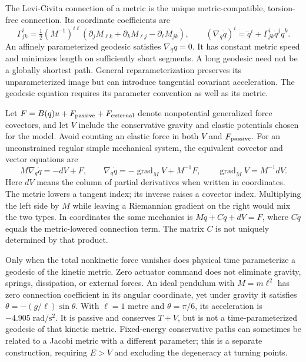 \documentclass[12pt, openany]{book}
\theoremstyle{plain}
\begin{document}
The Levi-Civita connection of a metric is the unique metric-compatible,
torsion-free connection. Its coordinate coefficients are
\begin{equation}\label{eq:manifold_christoffel}
 \Gamma^i_{jk}=\tfrac12(M^{-1})^{i\ell}
 (\partial_jM_{\ell k}+\partial_kM_{\ell j}-\partial_\ell M_{jk}),
 \qquad
 (\nabla_{\dot q}\dot q)^i=\ddot q^i+\Gamma^i_{jk}\dot q^j\dot q^k.
\end{equation}
An affinely parameterized geodesic satisfies $\nabla_{\dot q}\dot q=0$.
It has constant metric speed and minimizes length on sufficiently short
segments. A long geodesic need not be a globally shortest path. General
reparameterization preserves its unparameterized image but can introduce
tangential covariant acceleration. The geodesic equation requires its
parameter convention as well as its metric.

Let $F=B(q)u+F_{\rm passive}+F_{\rm external}$ denote nonpotential generalized
force covectors, and let $V$ include the conservative gravity and elastic
potentials chosen for the model. Avoid counting an elastic force in both
$V$ and $F_{\rm passive}$. For an unconstrained regular simple mechanical
system, the equivalent covector and vector equations are
\begin{equation}\label{eq:euler_lagrange_manifold}
 M\nabla_{\dot q}\dot q=-dV+F,\qquad
 \nabla_{\dot q}\dot q=-\operatorname{grad}_M V+M^{-1}F,
 \qquad \operatorname{grad}_M V=M^{-1}dV.
\end{equation}
Here $dV$ means the column of partial derivatives when written in coordinates.
The metric lowers a tangent index; its inverse raises a covector index.
Multiplying the left side by $M$ while leaving a Riemannian gradient on the
right would mix the two types. In coordinates the same mechanics is
$M\ddot q+C\dot q+dV=F$, where $C\dot q$ equals the metric-lowered connection
term. The matrix $C$ is not uniquely determined by that product.

Only when the total nonkinetic force vanishes does physical time parameterize
a geodesic of the kinetic metric. Zero actuator command does not eliminate
gravity, springs, dissipation, or external forces. An ideal pendulum with
$M=m\ell^2$ has zero connection coefficient in its angular coordinate, yet
under gravity it satisfies $\ddot\theta=-(g/\ell)\sin\theta$. With $\ell=1$
metre and $\theta=\pi/6$, its acceleration is $-4.905\;\mathrm{rad/s^2}$.
It is passive and conserves $T+V$, but is not a time-parameterized geodesic
of that kinetic metric. Fixed-energy conservative paths can sometimes be
related to a Jacobi metric with a different parameter; this is a separate
construction, requiring $E>V$ and excluding the degeneracy at turning points.
\end{document}
